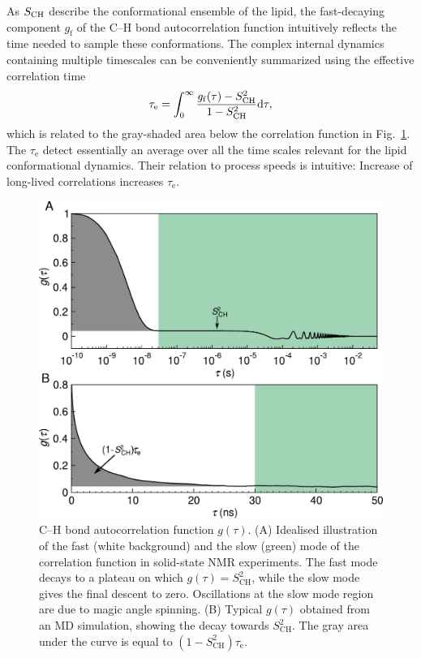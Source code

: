 \documentclass[journal=jcisd8,manuscript=article,layout=twocolumn]{achemso}
\begin{document}
As $S_{\rm{CH}}$ describe the conformational ensemble of the lipid, the fast-decaying component $g_\mathrm f$ of the C--H bond autocorrelation function intuitively reflects the time needed to sample these conformations.
The complex internal dynamics containing multiple timescales can be conveniently summarized using the effective correlation time
\begin{equation}
\label{eq:teff}
\tau_\mathrm{e}=\int_{0}^{\infty}\frac{g_{\mathrm{f}}(\tau)-S^{2}_{\rm{CH}}}{1-S^2_{\mathrm{CH}}}\mathrm d\tau,
\end{equation}
which is related to the gray-shaded area below the correlation function in Fig.~\ref{fig:schem_teff}.
The $\tau_\mathrm{e}$ detect essentially an average over all the time scales relevant for the lipid conformational dynamics.
Their relation to process speeds is intuitive: Increase of long-lived correlations increases $\tau_\mathrm{e}$.

\begin{figure}[t]
\includegraphics[scale=0.45]{../Figs/gfun_draft.pdf} 
\caption{C--H bond autocorrelation function $g(\tau)$. (A) Idealised illustration of the fast (white background) and the slow (green) mode of the correlation function in solid-state NMR experiments. The fast mode decays to a plateau on which $g(\tau)=S^2_{\mathrm{CH}}$, while the slow mode gives the final descent to zero. Oscillations at the slow mode region are due to magic angle spinning. (B) Typical $g(\tau)$ obtained from an MD simulation, showing the decay towards $S^2_{\mathrm{CH}}$. The gray area under the curve is equal to $(1-S^2_{\mathrm{CH}})\tau_\mathrm{e}$. }
\label{fig:schem_teff}
\end{figure} 
\end{document}
